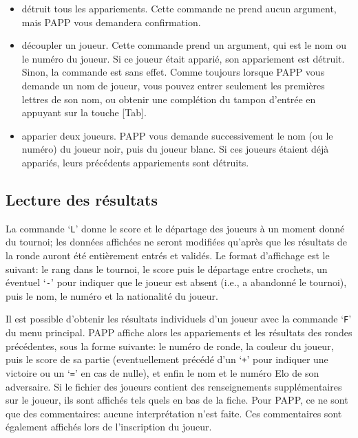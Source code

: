 \documentclass[10pt]{article}
\begin{document}
\begin{itemize}

	\item[`{\tt Z}':] d\'etruit tous les appariements. Cette commande ne
prend aucun argument, mais PAPP vous demandera confirmation.

\item[`{\tt D}':] d\'ecoupler un joueur. Cette commande prend un 
argument, qui est le nom ou le num\'ero du joueur.  Si ce joueur 
\'etait appari\'e, son appariement est d\'etruit.  Sinon, la commande 
est sans effet.  Comme toujours lorsque PAPP vous demande un nom de 
joueur, vous pouvez entrer seulement les premi\`eres lettres de son 
nom, ou obtenir une compl\'etion du tampon d'entr\'ee en appuyant sur 
la touche [Tab].

\item[`{\tt A}':] apparier deux joueurs.  PAPP vous demande 
successivement le nom (ou le num\'ero) du joueur noir, puis du joueur 
blanc.  Si ces joueurs \'etaient d\'ej\`a appari\'es, leurs 
pr\'ec\'edents appariements sont d\'etruits.

\end{itemize}

\subsection{Lecture des r\'esultats}

	La commande `\verb|L|' donne le score et le d\'epartage des
joueurs \`a un moment donn\'e du tournoi; les donn\'ees affich\'ees ne
seront modifi\'ees qu'apr\`es que les r\'esultats de la ronde auront
\'et\'e enti\`erement entr\'es et valid\'es.  Le format d'affichage est
le suivant: le rang dans le tournoi, le score puis le d\'epartage entre
crochets, un \'eventuel `\verb|-|' pour indiquer que le joueur est
absent (i.e., a abandonn\'e le tournoi), puis le nom, le num\'ero et la
nationalit\'e du joueur.

Il est possible d'obtenir les r\'esultats individuels d'un joueur avec 
la commande `\verb|F|' du menu principal. PAPP affiche alors les 
appariements et les r\'esultats des rondes pr\'ec\'edentes, sous la 
forme suivante: le num\'ero de ronde, la couleur du joueur, puis le 
score de sa partie (eventuellement pr\'ec\'ed\'e d'un `\verb|+|' pour 
indiquer une victoire ou un `\verb|=|' en cas de nulle), et enfin le 
nom et le num\'ero Elo de son adversaire.  Si le fichier des joueurs 
contient des renseignements suppl\'ementaires sur le joueur, ils sont 
affich\'es tels quels en bas de la fiche.  Pour PAPP, ce ne sont que 
des commentaires: aucune interpr\'etation n'est faite.  Ces 
commentaires sont \'egalement affich\'es lors de l'inscription du 
joueur.
\end{document}
